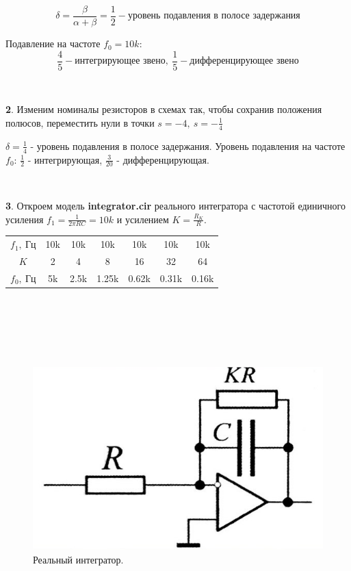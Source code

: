 \documentclass[a4paper, 12pt, twoside]{article}
\begin{document}
$$\delta = \dfrac{\beta}{\alpha+\beta} = \dfrac{1}{2}-\text{уровень подавления в полосе задержания}$$

Подавление на частоте $f_0 = 10k$:
$$\dfrac{4}{5} - \text{интегрирующее звено},~\dfrac{1}{5} - \text{дифференцирующее звено}$$



~

\textbf{2}. Изменим номиналы резисторов в схемах так, чтобы сохранив положения полюсов, переместить нули в точки $s=-4,~s=-\frac{1}{4}$

$\delta = \frac{1}{4}$ - уровень подавления в полосе задержания.
Уровень подавления на частоте $f_0$: $\frac{1}{2}$ - интегрирующая, $\frac{3}{20}$ - дифференцирующая.

~

\textbf{3}. Откроем модель \textbf{integrator.cir} реального интегратора с частотой единичного усиления $f_1 = \frac{1}{2\pi RC} = 10k$ и усилением $K = \frac{R_K}{R}$.

\begin{minipage}{0.35\linewidth}
\begin{table}[H]
	\centering
	\begin{tabular}{c|cccccc}\toprule
		$f_1,~\text{Гц}$ & 10k & 10k  & 10k   & 10k   & 10k   & 10k   \\
		$K$              & 2   & 4    & 8     & 16    & 32    & 64    \\
		$f_0,~\text{Гц}$ & 5k  & 2.5k & 1.25k & 0.62k & 0.31k & 0.16k \\ \bottomrule
	\end{tabular}
\end{table}
\end{minipage}
~
\begin{minipage}{0.2\linewidth}
$ \; $



\end{minipage}
~
\begin{minipage}[R]{0.35\linewidth}
	\begin{figure}[H]
		\centering
		\includegraphics[width =  0.8\linewidth]{rint}
		\caption{Реальный интегратор.}
	\end{figure}
\end{minipage}
\end{document}

